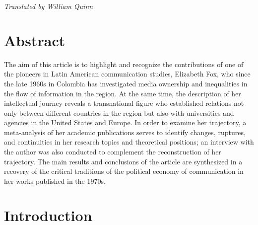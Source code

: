 \documentclass{tufte-handout}
\begin{document}
\begin{titlepage}
\begin{fullwidth}
\end{fullwidth}

\noindent\emph{Translated by William Quinn}

\vspace*{1em}

\hypertarget{abstract}{%
\section{Abstract}\label{abstract}}

The aim of this article is to highlight and recognize the contributions
of one of the pioneers in Latin American communication studies,
Elizabeth Fox, who since the late 1960s in Colombia has investigated
media ownership and inequalities in the flow of information in the
region. At the same time, the description of her intellectual journey
reveals a transnational figure who established relations not only
between different countries in the region but also with universities and
agencies in the United States and Europe. In order to examine her
trajectory, a meta-analysis of her academic publications serves to
identify changes, ruptures, and continuities in her research topics and
theoretical positions; an interview with the author was also conducted
to complement the reconstruction of her trajectory. The main results and
conclusions of the article are synthesized in a recovery of the critical
traditions of the political economy of communication in her works
published in the 1970s.





\enlargethispage{2\baselineskip}

\vspace*{10em}



 \end{titlepage}




\hypertarget{introduction}{%
\section{Introduction}\label{introduction}}
\end{document}
